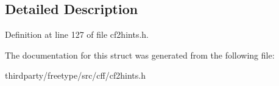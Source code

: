 \subsection{Detailed Description}


Definition at line 127 of file cf2hints.\+h.



The documentation for this struct was generated from the following file\+:\begin{DoxyCompactItemize}
\item 
thirdparty/freetype/src/cff/cf2hints.\+h\end{DoxyCompactItemize}

